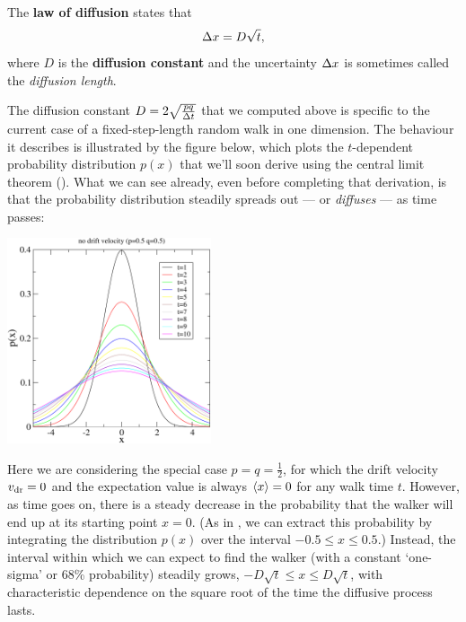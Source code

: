 \begin{shaded}
  The \textbf{law of diffusion} states that
  \begin{equation}
    \label{eq:diff_law}
    \Delta x = D \sqrt{t},
  \end{equation}
  where $D$ is the \textbf{diffusion constant} and the uncertainty $\Delta x$ is sometimes called the \textit{diffusion length}.
\end{shaded}

The diffusion constant $D = 2\sqrt{\frac{pq}{\Delta t}}$ that we computed above is specific to the current case of a fixed-step-length random walk in one dimension.
The behaviour it describes is illustrated by the figure below, which plots the $t$-dependent probability distribution $p(x)$ that we'll soon derive using the central limit theorem ().
What we can see already, even before completing that derivation, is that the probability distribution steadily spreads out --- or \textit{diffuses} --- as time passes:
\begin{center}
  \includegraphics[width=0.45\textwidth]{figs/unit01_diff_zero.pdf}
\end{center}
Here we are considering the special case $p = q = \frac{1}{2}$, for which the drift velocity $v_{\mathrm{dr}} = 0$ and the expectation value is always $\left\langle x \right\rangle = 0$ for any walk time $t$.
However, as time goes on, there is a steady decrease in the probability that the walker will end up at its starting point $x = 0$.
(As in , we can extract this probability by integrating the distribution $p(x)$ over the interval $-0.5 \leq x \leq 0.5$.)
Instead, the interval within which we can expect to find the walker (with a constant `one-sigma' or 68\% probability) steadily grows, $-D\sqrt{t} \leq x \leq D\sqrt{t}$, with characteristic dependence on the square root of the time the diffusive process lasts.

